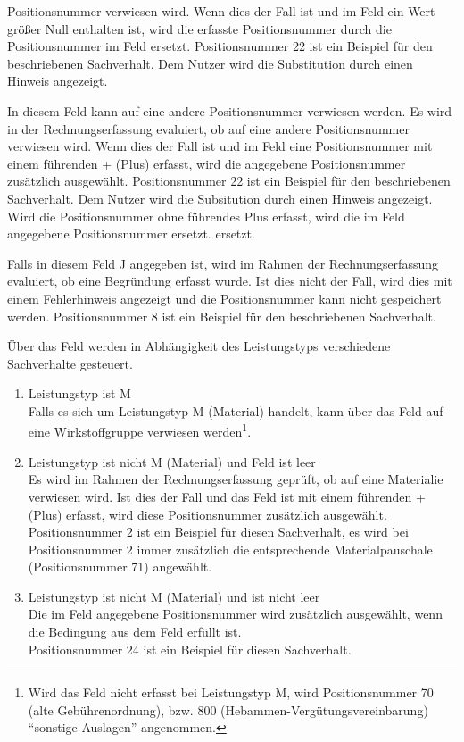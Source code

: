 \begin{description}
Positionsnummer verwiesen wird.
Wenn dies der Fall ist und im Feld
 ein Wert größer Null enthalten ist, 
wird die erfasste Positionsnummer
durch die Positionsnummer im Feld  ersetzt. Positionsnummer 22
ist ein Beispiel für den beschriebenen Sachverhalt. 
Dem Nutzer wird die Substitution durch einen Hinweis angezeigt. 
\item[Einmalig]
In diesem Feld kann auf eine andere Positionsnummer verwiesen
werden. Es wird in der Rechnungserfassung evaluiert, ob auf eine andere
Positionsnummer verwiesen wird. Wenn dies der Fall ist und im Feld
 eine Positionsnummer mit einem führenden + (Plus) erfasst,
wird die
angegebene Positionsnummer zusätzlich ausgewählt. Positionsnummer 22 ist
ein Beispiel für den beschriebenen Sachverhalt. Dem Nutzer wird die
Subsitution durch einen Hinweis angezeigt.
Wird die Positionsnummer ohne führendes Plus erfasst, wird die im Feld
 angegebene Positionsnummer ersetzt.
ersetzt.
\item[Begründungspflicht]
Falls in diesem Feld J angegeben ist, wird im Rahmen der Rechnungserfassung
evaluiert, ob eine Begründung erfasst wurde. Ist dies nicht der Fall,
wird dies mit einem Fehlerhinweis angezeigt und die Positionsnummer kann
nicht gespeichert werden. Positionsnummer 8 ist ein Beispiel für den
beschriebenen Sachverhalt.
\item[Zusatzgeb.1] 
Über das Feld  werden in Abhängigkeit des Leistungstyps
verschiedene Sachverhalte gesteuert.
\begin{enumerate}
\item{Leistungstyp ist M}\\
Falls es sich um Leistungstyp M (Material) handelt, kann über das Feld
 auf eine Wirkstoffgruppe verwiesen 
werden\footnote{Wird das
Feld nicht erfasst bei Leistungstyp M, wird Positionsnummer 70 (alte
Gebührenordnung), bzw. 800 (Hebammen-Vergütungsvereinbarung)
``sonstige Auslagen'' angenommen.}.
\item{Leistungstyp ist nicht M (Material) und Feld  ist leer}\\
Es wird im Rahmen der Rechnungserfassung geprüft, ob auf eine 
Materialie verwiesen wird. Ist dies der Fall und das Feld 
 ist mit einem führenden + (Plus) erfasst, wird diese
Positionsnummer zusätzlich ausgewählt.\\
Positionsnummer 2 ist ein Beispiel
für diesen Sachverhalt, es wird bei Positionsnummer 2 immer zusätzlich die
entsprechende Materialpauschale (Positionsnummer 71) angewählt.
\item{Leistungstyp ist nicht M (Material) und  ist nicht leer}\\
Die im Feld  angegebene Positionsnummer wird 
zusätzlich ausgewählt, wenn die Bedingung aus dem Feld 
erfüllt ist.\\
Positionsnummer 24 ist ein Beispiel für diesen Sachverhalt.
\end{enumerate}


\end{description}
